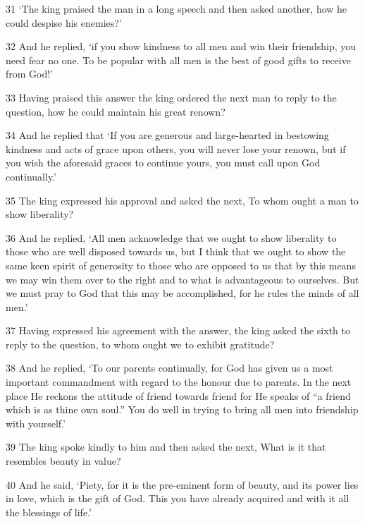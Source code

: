 \par 31 ‘The king praised the man in a long speech and then asked another, how he could despise his enemies?’

\par 32 And he replied, ‘if you show kindness to all men and win their friendship, you need fear no one. To be popular with all men is the best of good gifts to receive from God!’

\par 33 Having praised this answer the king ordered the next man to reply to the question, how he could maintain his great renown?

\par 34 And he replied that ‘If you are generous and large-hearted in bestowing kindness and acts of grace upon others, you will never lose your renown, but if you wish the aforesaid graces to continue yours, you must call upon God continually.’

\par 35 The king expressed his approval and asked the next, To whom ought a man to show liberality?

\par 36 And he replied, ‘All men acknowledge that we ought to show liberality to those who are well disposed towards us, but I think that we ought to show the same keen spirit of generosity to those who are opposed to us that by this means we may win them over to the right and to what is advantageous to ourselves. But we must pray to God that this may be accomplished, for he rules the minds of all men.’

\par 37 Having expressed his agreement with the answer, the king asked the sixth to reply to the question, to whom ought we to exhibit gratitude?

\par 38 And he replied, ‘To our parents continually, for God has given us a most important commandment with regard to the honour due to parents. In the next place He reckons the attitude of friend towards friend for He speaks of “a friend which is as thine own soul.” You do well in trying to bring all men into friendship with yourself.’

\par 39 The king spoke kindly to him and then asked the next, What is it that resembles beauty in value?

\par 40 And he said, ‘Piety, for it is the pre-eminent form of beauty, and its power lies in love, which is the gift of God. This you have already acquired and with it all the blessings of life.’

